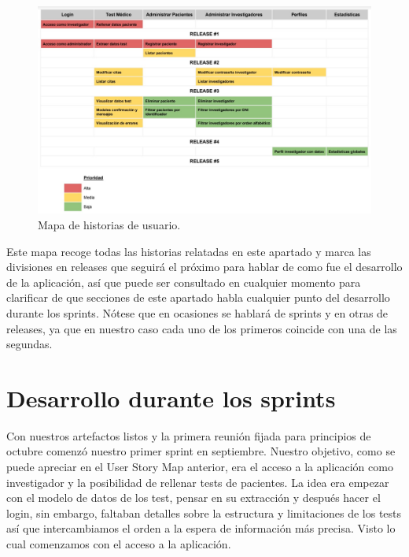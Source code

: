  \begin{figure}[h]
    \centering
     \includegraphics[width=1\textwidth]{images/userStoryMap.jpg}
    \caption{Mapa de historias de usuario.}
\end{figure}

Este mapa recoge todas las historias relatadas en este apartado y marca las divisiones en releases que seguirá el próximo para hablar de como fue el desarrollo de la aplicación, así que puede ser consultado en cualquier momento para clarificar de que secciones de este apartado habla cualquier punto del desarrollo durante los sprints. Nótese que en ocasiones se hablará de sprints y en otras de releases, ya que en nuestro caso cada uno de los primeros coincide con una de las segundas.

\newpage

\section{Desarrollo durante los sprints}

Con nuestros artefactos listos y la primera reunión fijada para principios de octubre comenzó nuestro primer sprint en septiembre. Nuestro objetivo, como se puede apreciar en el User Story Map anterior, era el acceso a la aplicación como investigador y la posibilidad de rellenar tests de pacientes. La idea era empezar con el modelo de datos de los test, pensar en su extracción y después hacer el login, sin embargo, faltaban detalles sobre la estructura y limitaciones de los tests así que intercambiamos el orden a la espera de información más precisa. Visto lo cual comenzamos con el acceso a la aplicación.
\newline

